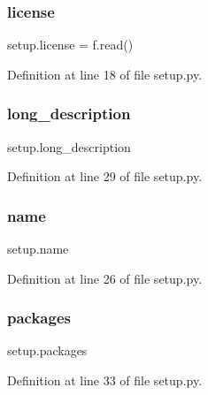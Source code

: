 \subsubsection{\texorpdfstring{license}{license}}
{\footnotesize\ttfamily setup.\+license = f.\+read()}



Definition at line 18 of file setup.\+py.

\mbox{\label{namespacesetup_a4cda9dbfb952875376a0749fe08a5bde}} 
\subsubsection{\texorpdfstring{long\+\_\+description}{long\_description}}
{\footnotesize\ttfamily setup.\+long\+\_\+description}



Definition at line 29 of file setup.\+py.

\mbox{\label{namespacesetup_ab3a7a0638d76a01367c5bc3cc699447f}} 
\subsubsection{\texorpdfstring{name}{name}}
{\footnotesize\ttfamily setup.\+name}



Definition at line 26 of file setup.\+py.

\mbox{\label{namespacesetup_aff2375a361fd5865c77bd9aa093be747}} 
\subsubsection{\texorpdfstring{packages}{packages}}
{\footnotesize\ttfamily setup.\+packages}



Definition at line 33 of file setup.\+py.

\mbox{\label{namespacesetup_aa7ca7bc9391b217e81efeb03689d8dbf}} 
